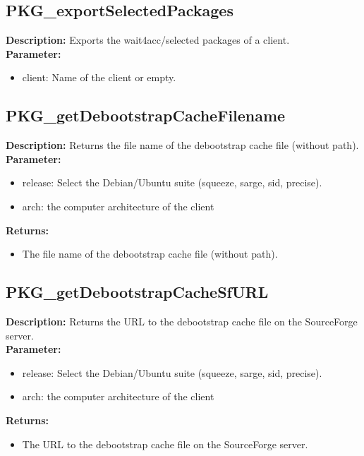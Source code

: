 \subsection{PKG\_exportSelectedPackages}
\textbf{Description:} Exports the wait4acc/selected packages of a client.\\
\textbf{Parameter:}
\begin{itemize}
\item client: Name of the client or empty.
\end{itemize}

\subsection{PKG\_getDebootstrapCacheFilename}
\textbf{Description:} Returns the file name of the debootstrap cache file (without path).\\
\textbf{Parameter:}
\begin{itemize}
\item release: Select the Debian/Ubuntu suite (squeeze, sarge, sid, precise).
\item arch: the computer architecture of the client
\end{itemize}
\textbf{Returns:}
\begin{itemize}
\item The file name of the debootstrap cache file (without path).
\end{itemize}

\subsection{PKG\_getDebootstrapCacheSfURL}
\textbf{Description:} Returns the URL to the debootstrap cache file on the SourceForge server.\\
\textbf{Parameter:}
\begin{itemize}
\item release: Select the Debian/Ubuntu suite (squeeze, sarge, sid, precise).
\item arch: the computer architecture of the client
\end{itemize}
\textbf{Returns:}
\begin{itemize}
\item The URL to the debootstrap cache file on the SourceForge server.
\end{itemize}

